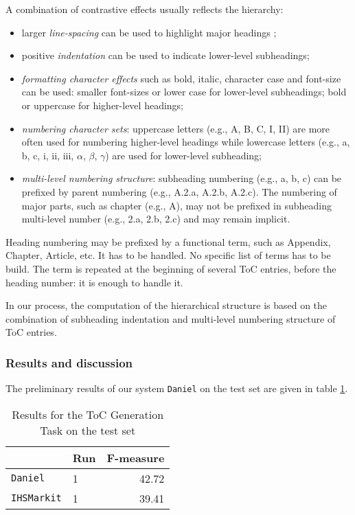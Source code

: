 A combination of contrastive effects usually reflects the hierarchy:
\begin{itemize}
    \item larger \emph{line-spacing} can be used to highlight major headings ;
    \item positive \emph{indentation} can be used to indicate lower-level subheadings;
    \item \emph{formatting character effects} such as bold, italic, character case and font-size can be used: smaller font-sizes or lower case for lower-level subheadings; bold or uppercase for higher-level headings;
    \item \emph{numbering character sets}: uppercase letters (e.g., A, B, C, I, II)  are more often used for numbering higher-level headings while lowercase letters (e.g., a, b, c, i, ii, iii, $\alpha$, $\beta$, $\gamma$) are used for lower-level subheading;
    \item \emph{multi-level numbering structure}: subheading numbering (e.g., a, b, c) can be prefixed by parent numbering (e.g., A.2.a, A.2.b, A.2.c). The numbering of major parts, such as chapter (e.g., A), may not be prefixed in subheading multi-level number (e.g., 2.a, 2.b, 2.c) and may remain implicit.
\end{itemize}
 
Heading numbering may be prefixed by a functional term, such as Appendix, Chapter, Article, etc. It has to be handled. No specific list of terms has to be build. The term is repeated at the beginning of several ToC entries, before the heading number: it is enough to handle it.

In our process, the computation of the hierarchical structure is based on the combination of subheading indentation and multi-level numbering structure of ToC entries.

\subsubsection{Results and discussion}

The preliminary results of our system \texttt{Daniel} on the test set are given in table \ref{res:toc}.   

\begin{table}
\begin{tabular}{l|l|r}
     & Run & F-measure\\\hline
\texttt{Daniel}  & 1 &      42.72\\\hline
\texttt{IHSMarkit} & 1 &   39.41
\end{tabular}
\caption{Results for the ToC Generation Task on the test set}
\label{res:toc}
\end{table}

